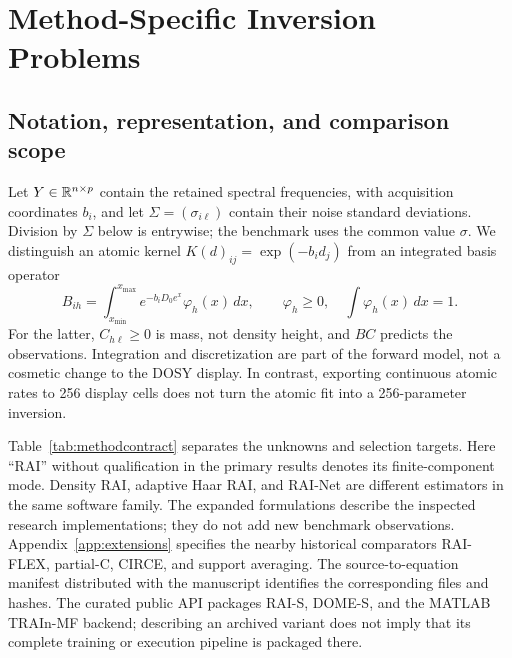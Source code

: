 \section{Method-Specific Inversion Problems}\label{sec:methods}
\subsection{Notation, representation, and comparison scope}
Let $Y\in\mathbb{R}^{n\times p}$ contain the retained spectral frequencies, with acquisition coordinates $b_i$, and let $\Sigma=(\sigma_{i\ell})$ contain their noise standard deviations. Division by $\Sigma$ below is entrywise; the benchmark uses the common value $\sigma$. We distinguish an atomic kernel $K(d)_{ij}=\exp(-b_i d_j)$ from an integrated basis operator
\begin{equation}\label{eq:integratedbasis}
 B_{ih}=\int_{x_{\min}}^{x_{\max}}e^{-b_iD_0e^x}\varphi_h(x)\,dx,
 \qquad \varphi_h\geq0,\quad \int\varphi_h(x)\,dx=1.
\end{equation}
For the latter, $C_{h\ell}\geq0$ is mass, not density height, and $BC$ predicts the observations. Integration and discretization are part of the forward model, not a cosmetic change to the DOSY display. In contrast, exporting continuous atomic rates to 256 display cells does not turn the atomic fit into a 256-parameter inversion.

Table~\ref{tab:methodcontract} separates the unknowns and selection targets. Here ``RAI'' without qualification in the primary results denotes its finite-component mode. Density RAI, adaptive Haar RAI, and RAI-Net are different estimators in the same software family. The expanded formulations describe the inspected research implementations; they do not add new benchmark observations. Appendix~\ref{app:extensions} specifies the nearby historical comparators RAI-FLEX, partial-C, CIRCE, and support averaging. The source-to-equation manifest distributed with the manuscript identifies the corresponding files and hashes. The curated public API packages RAI-S, DOME-S, and the MATLAB TRAIn-MF backend; describing an archived variant does not imply that its complete training or execution pipeline is packaged there.

